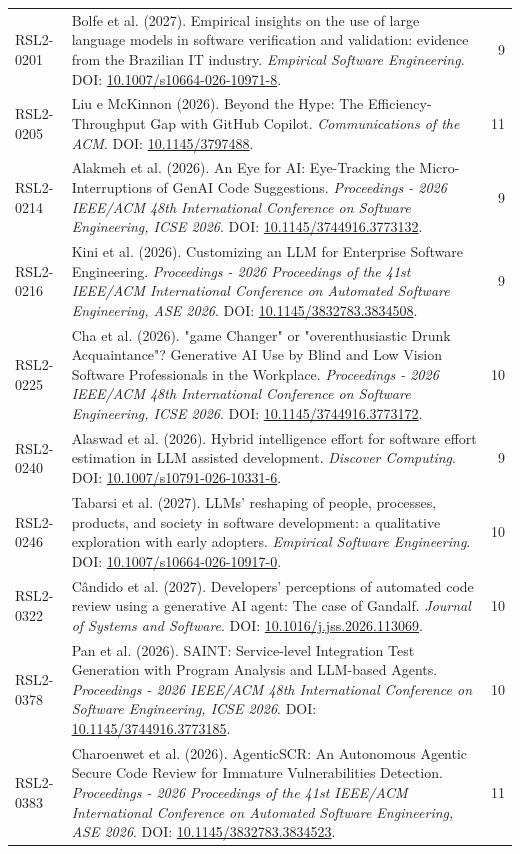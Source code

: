 \begin{small}
\begin{longtable}{lp{11.2cm}r}
RSL2-0201 & Bolfe et al. (2027). Empirical insights on the use of large language models in software verification and validation: evidence from the Brazilian IT industry. \textit{Empirical Software Engineering}. DOI: \url{10.1007/s10664-026-10971-8}. & 9 \\
RSL2-0205 & Liu e McKinnon (2026). Beyond the Hype: The Efficiency-Throughput Gap with GitHub Copilot. \textit{Communications of the ACM}. DOI: \url{10.1145/3797488}. & 11 \\
RSL2-0214 & Alakmeh et al. (2026). An Eye for AI: Eye-Tracking the Micro-Interruptions of GenAI Code Suggestions. \textit{Proceedings - 2026 IEEE/ACM 48th International Conference on Software Engineering, ICSE 2026}. DOI: \url{10.1145/3744916.3773132}. & 9 \\
RSL2-0216 & Kini et al. (2026). Customizing an LLM for Enterprise Software Engineering. \textit{Proceedings - 2026 Proceedings of the 41st IEEE/ACM International Conference on Automated Software Engineering, ASE 2026}. DOI: \url{10.1145/3832783.3834508}. & 9 \\
RSL2-0225 & Cha et al. (2026). "game Changer" or "overenthusiastic Drunk Acquaintance"? Generative AI Use by Blind and Low Vision Software Professionals in the Workplace. \textit{Proceedings - 2026 IEEE/ACM 48th International Conference on Software Engineering, ICSE 2026}. DOI: \url{10.1145/3744916.3773172}. & 10 \\
RSL2-0240 & Alaswad et al. (2026). Hybrid intelligence effort for software effort estimation in LLM assisted development. \textit{Discover Computing}. DOI: \url{10.1007/s10791-026-10331-6}. & 9 \\
RSL2-0246 & Tabarsi et al. (2027). LLMs’ reshaping of people, processes, products, and society in software development: a qualitative exploration with early adopters. \textit{Empirical Software Engineering}. DOI: \url{10.1007/s10664-026-10917-0}. & 10 \\
RSL2-0322 & Cândido et al. (2027). Developers’ perceptions of automated code review using a generative AI agent: The case of Gandalf. \textit{Journal of Systems and Software}. DOI: \url{10.1016/j.jss.2026.113069}. & 10 \\
RSL2-0378 & Pan et al. (2026). SAINT: Service-level Integration Test Generation with Program Analysis and LLM-based Agents. \textit{Proceedings - 2026 IEEE/ACM 48th International Conference on Software Engineering, ICSE 2026}. DOI: \url{10.1145/3744916.3773185}. & 10 \\
RSL2-0383 & Charoenwet et al. (2026). AgenticSCR: An Autonomous Agentic Secure Code Review for Immature Vulnerabilities Detection. \textit{Proceedings - 2026 Proceedings of the 41st IEEE/ACM International Conference on Automated Software Engineering, ASE 2026}. DOI: \url{10.1145/3832783.3834523}. & 11 \\

\end{longtable}
\end{small}
